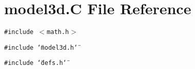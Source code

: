 \section{model3d.C File Reference}
\label{model3d_8C}
{\tt \#include $<$math.h$>$}\par
{\tt \#include \char`\"{}model3d.h\char`\"{}}\par
{\tt \#include \char`\"{}defs.h\char`\"{}}\par
